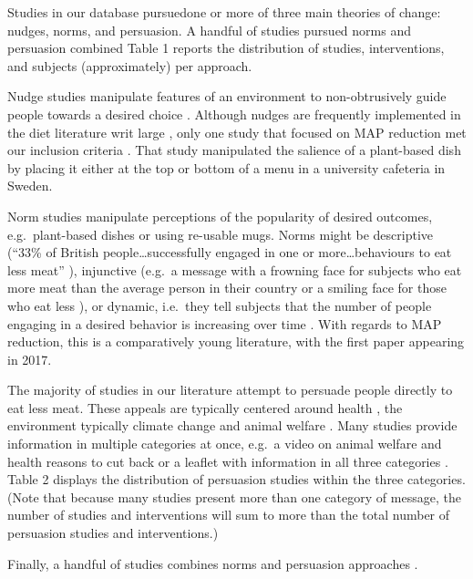 \documentclass[sn-nature,pdflatex]{sn-jnl}
\begin{document}
Studies in our database pursuedone or more of three main theories of
change: nudges, norms, and persuasion. A handful of studies pursued
norms and persuasion combined Table 1 reports the distribution of
studies, interventions, and subjects (approximately) per approach.

Nudge studies manipulate features of an environment to non-obtrusively
guide people towards a desired choice \citep{thaler2009}. Although
nudges are frequently implemented in the diet literature writ large
\citep{olafsson2024, cadario2020, szaszi2018}, only one study that
focused on MAP reduction met our inclusion criteria
\citep{andersson2021}. That study manipulated the salience of a
plant-based dish by placing it either at the top or bottom of a menu in
a university cafeteria in Sweden.

Norm studies manipulate perceptions of the popularity of desired
outcomes, e.g.~plant-based dishes \citep{sparkman2021} or using
re-usable mugs\citep{loschelder2019}. Norms might be descriptive (``33\%
of British people\ldots successfully engaged in one or
more\ldots behaviours to eat less meat'' \citep{aldoh2023}), injunctive
(e.g.~a message with a frowning face for subjects who eat more meat than
the average person in their country or a smiling face for those who eat
less \citep{alblas2023}), or dynamic, i.e.~they tell subjects that the
number of people engaging in a desired behavior is increasing over time
\citep{aldoh2023, coker2022, sparkman2017, sparkman2020, sparkman2021}.
With regards to MAP reduction, this is a comparatively young literature,
with the first paper appearing in 2017.

The majority of studies in our literature attempt to persuade people
directly to eat less meat. These appeals are typically centered around
health \citep{lacroix2020}, the environment \citep{carfora2023}
\textemdash typically climate change \textemdash and animal welfare
\citep{haile2021}. Many studies provide information in multiple
categories at once, e.g.~a video on animal welfare and health reasons to
cut back \citep{feltz2022} or a leaflet with information in all three
categories \citep{hennessy2016}. Table 2 displays the distribution of
persuasion studies within the three categories. (Note that because many
studies present more than one category of message, the number of studies
and interventions will sum to more than the total number of persuasion
studies and interventions.)

Finally, a handful of studies combines norms and persuasion approaches
\citep{hennessy2016, carfora2023, lacroix2020, mattson2020, piester2020}.
\end{document}
